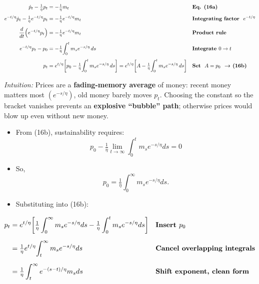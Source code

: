 \documentclass[12pt]{article}
\begin{document}
\singlespacing
\begin{align}
\dot p_t - \tfrac{1}{\eta}p_t &= -\tfrac{1}{\eta} m_t && \text{\textbf{Eq. (16a)}} \\[4pt]
e^{-t/\eta}\dot p_t - \tfrac{1}{\eta}e^{-t/\eta}p_t &= -\tfrac{1}{\eta} e^{-t/\eta} m_t && \text{\textbf{Integrating factor } $e^{-t/\eta}$} \\[4pt]
\frac{d}{dt}\!\left(e^{-t/\eta}p_t\right) &= -\tfrac{1}{\eta} e^{-t/\eta} m_t && \text{\textbf{Product rule}} \\[4pt]
e^{-t/\eta}p_t - p_0 &= -\tfrac{1}{\eta}\!\int_0^t m_s e^{-s/\eta}\,ds && \text{\textbf{Integrate $0\to t$}} \\[4pt]
p_t &= e^{t/\eta}\!\left[p_0 - \tfrac{1}{\eta}\!\int_0^t m_s e^{-s/\eta}\,ds\right] = e^{t/\eta}\!\left[A - \tfrac{1}{\eta}\!\int_0^t m_s e^{-s/\eta}\,ds\right] && \text{\textbf{Set } $A=p_0$ \textbf{ → (16b)}}
\end{align}

\textit{Intuition:} Prices are a \textbf{fading-memory average} of money: recent money matters most \((e^{-s/\eta})\), old money barely moves \(p_t\).  
Choosing the constant so the bracket vanishes prevents an \textbf{explosive “bubble” path}; otherwise prices would blow up even without new money.

\begin{itemize}
    \item From (16b), sustainability requires:
    \[
      p_0 - \tfrac{1}{\eta}\lim_{t\to\infty}\int_0^t m_s e^{-s/\eta}ds = 0
    \]
    \item So,
    \[
      p_0 = \tfrac{1}{\eta}\int_0^\infty m_s e^{-s/\eta}ds .
    \]
    \item Substituting into (16b):
\end{itemize}

\singlespacing
\begin{align}
p_t &= e^{t/\eta}\!\left[\tfrac{1}{\eta}\int_0^\infty m_s e^{-s/\eta}ds - \tfrac{1}{\eta}\int_0^t m_s e^{-s/\eta}ds\right] 
      && \text{\textbf{Insert $p_0$}} \\[6pt]
    &= \tfrac{1}{\eta} e^{t/\eta}\!\int_t^\infty m_s e^{-s/\eta}ds 
      && \text{\textbf{Cancel overlapping integrals}} \\[6pt]
    &= \tfrac{1}{\eta}\int_t^\infty e^{-(s-t)/\eta} m_s ds 
      && \text{\textbf{Shift exponent, clean form}}
\end{align}
\end{document}
